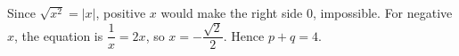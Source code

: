 Since $\sqrt{x^2}=|x|$, positive $x$ would make the right side 0, impossible. For negative $x$, the equation is $\dfrac{1}{x}=2x$, so $x=-\dfrac{\sqrt2}{2}$. Hence $\boxed{p+q=4}$.
